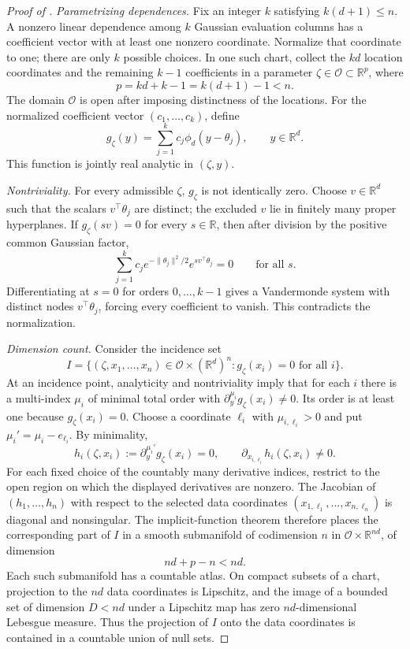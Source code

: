 \documentclass[11pt]{article}
\theoremstyle{definition}
\theoremstyle{remark}
\newcommand{\RR}{\mathbb R}
\newcommand{\norm}[1]{\lVert #1\rVert}
\begin{document}
\begin{proof}[Proof of ]
\emph{Parametrizing dependences.}  Fix an integer $k$ satisfying
$k(d+1)\le n$.  A nonzero linear dependence among $k$ Gaussian evaluation
columns has a coefficient vector with at least one nonzero coordinate.
Normalize that coordinate to one; there are only $k$ possible choices.  In
one such chart, collect the $kd$ location coordinates and the remaining
$k-1$ coefficients in a parameter $\zeta\in\mathcal O\subset\RR^p$, where
\[
 p=kd+k-1=k(d+1)-1<n.
\]
The domain $\mathcal O$ is open after imposing distinctness of the
locations.  For the normalized coefficient vector $(c_1,\ldots,c_k)$, define
\[
 g_\zeta(y)=\sum_{j=1}^kc_j\phi_d(y-\theta_j),\qquad y\in\RR^d.
\]
This function is jointly real analytic in $(\zeta,y)$.

\emph{Nontriviality.}  For every admissible $\zeta$, $g_\zeta$ is not
identically zero.  Choose $v\in\RR^d$ such that the scalars $v^\top\theta_j$
are distinct; the excluded $v$ lie in finitely many proper hyperplanes.  If
$g_\zeta(sv)=0$ for every $s\in\RR$, then after division by the positive
common Gaussian factor,
\[
 \sum_{j=1}^kc_j e^{-\norm{\theta_j}^2/2}e^{s v^\top\theta_j}=0
 \qquad\text{for all }s.
\]
Differentiating at $s=0$ for orders $0,\ldots,k-1$ gives a Vandermonde
system with distinct nodes $v^\top\theta_j$, forcing every coefficient to
vanish.  This contradicts the normalization.

\emph{Dimension count.}  Consider the incidence set
\[
 I=\{(\zeta,x_1,\ldots,x_n)\in \mathcal O\times(\RR^d)^n:
        g_\zeta(x_i)=0\text{ for all }i\}.
\]
At an incidence point, analyticity and nontriviality imply that for each $i$
there is a multi-index $\mu_i$ of minimal total order with
$\partial_y^{\mu_i}g_\zeta(x_i)\ne0$.  Its order is at least one because
$g_\zeta(x_i)=0$.  Choose a coordinate $\ell_i$ with $\mu_{i,\ell_i}>0$ and
put $\mu_i'=\mu_i-e_{\ell_i}$.  By minimality,
\[
 h_i(\zeta,x_i):=\partial_y^{\mu_i'}g_\zeta(x_i)=0,
 \qquad
 \partial_{x_{i,\ell_i}}h_i(\zeta,x_i)\ne0.
\]
For each fixed choice of the countably many derivative indices, restrict to
the open region on which the displayed derivatives are nonzero.  The
Jacobian of $(h_1,\ldots,h_n)$ with respect to the selected data coordinates
$(x_{1,\ell_1},\ldots,x_{n,\ell_n})$ is diagonal and nonsingular.  The
implicit-function theorem therefore places the corresponding part of $I$ in
a smooth submanifold of codimension $n$ in $\mathcal O\times\RR^{nd}$, of
dimension
\[
 nd+p-n<nd.
\]
Each such submanifold has a countable atlas.  On compact subsets of a chart,
projection to the $nd$ data coordinates is Lipschitz, and the image of a
bounded set of dimension $D<nd$ under a Lipschitz map has zero
$nd$-dimensional Lebesgue measure.  Thus the projection of $I$ onto the data
coordinates is contained in a countable union of null sets.


\end{proof}
\end{document}
